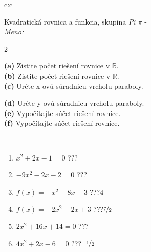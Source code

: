\documentclass[10pt]{report}
\begin{document}
\begin{tabular}{c:c}
\begin{minipage}[c][104.5mm][t]{0.5\linewidth}
\begin{center}
\vspace{7mm}
{\huge {\LARGE Kvadratická rovnica a funkcia}, skupina \textit{Pi $\pi$} -}\\[5mm]
\textit{Meno:}\phantom{xxxxxxxxxxxxxxxxxxxxxxxxxxxxxxxxxxxxxxxxxxxxxxxxxxxxxxxxxxxxxxxxx}\\[5mm]
\begin{minipage}{0.95\linewidth}
\begin{center}
{\small \begin{multicols}{2} \raggedright
\textbf{(a)} Zistite počet riešení rovnice v \(\mathbb{R}\). \\[1mm]
\textbf{(b)} Zistite počet riešení rovnice v \(\mathbb{R}\). \\[1mm]
\textbf{(c)} Určte x-ovú súradnicu vrcholu paraboly. \par \columnbreak
\textbf{(d)} Určte y-ovú súradnicu vrcholu paraboly. \\[1mm]
\textbf{(e)} Vypočítajte súčet riešení rovnice. \\[1mm]
\textbf{(f)} Vypočítajte súčet riešení rovnice.
\end{multicols}
}
\end{center}
\end{minipage}
\\[4mm]
\begin{minipage}{0.79\linewidth}
\begin{center}
\begin{varwidth}{\linewidth}
\begin{enumerate}
\Large
\item $x^2+2x-1=0$\quad \dotfill\; ???\;\dotfill {}
\item $-9x^2-2x-2=0$\quad \dotfill\; ???\;\dotfill {}
\item $f(x)=-x^2-8x-3$\quad \dotfill\; ???\;\dotfill \quad $4$
\item $f(x)=-2x^2-2x+3$\quad \dotfill\; ???\;\dotfill \quad $\nicefrac{7}{2}$
\item $2x^2+16x+14=0$\quad \dotfill\; ???\;\dotfill {}
\item $4x^2+2x-6=0$\quad \dotfill\; ???\;\dotfill \quad $\nicefrac{-1}{2}$
\end{enumerate}
\end{varwidth}
\end{center}
\end{minipage}

\end{center}
\end{minipage}
\end{tabular}
\end{document}
